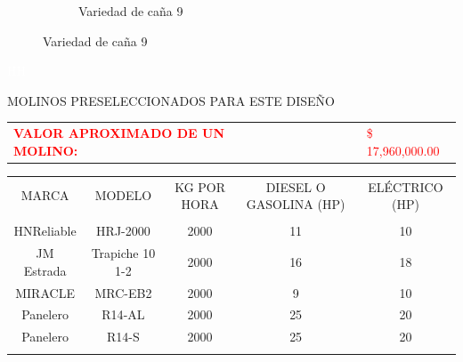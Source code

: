 \documentclass{article}%
\begin{document}
\begin{figure}[h!]
\begin{subfigure}{0.33\linewidth}
\caption{Variedad de caña 9}%
\end{subfigure}%
\linebreak%
\newpage%
\end{figure}

%
\newpage%
\textcolor{white}{ 
HH
}%
\newpage%
\begin{center}%
\begin{Huge}%
MOLINOS PRESELECCIONADOS PARA ESTE DISEÑO%
\end{Huge}%
\linebreak%
\end{center}%
\begin{tabular}{lcccccl}%
\textcolor{red}{ 
\textbf{VALOR APROXIMADO DE UN MOLINO: }
}& & & & & &\textcolor{red}{ 
\$ 17,960,000.00
}\\%
\end{tabular}%
\linebreak%
\begin{tabular}{ccccc}%
MARCA&MODELO&KG POR HORA&DIESEL O GASOLINA (HP)&ELÉCTRICO (HP)\\%
&&&&\\%
HNReliable&HRJ{-}2000&2000&11&10\\%
JM Estrada&Trapiche 10 1{-}2&2000&16&18\\%
MIRACLE&MRC{-}EB2&2000&9&10\\%
Panelero&R14{-}AL&2000&25&20\\%
Panelero&R14{-}S&2000&25&20\\%
\linebreak%
\newline%
%
\linebreak%
\end{tabular}%
\end{document}

